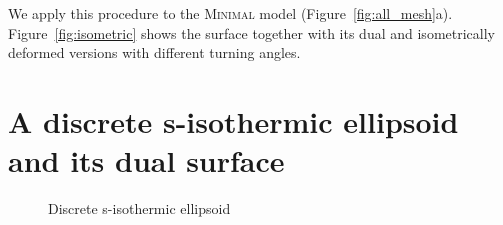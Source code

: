 \documentclass[Thesis.tex]{subfiles}
\begin{document}
We apply this procedure to the \textsc{Minimal} model
\mbox{(Figure~\ref{fig:all_mesh}a)}. Figure~\ref{fig:isometric} shows the
surface together
with its dual and isometrically deformed versions with different turning angles.

\section{A discrete s-isothermic ellipsoid and its dual surface}
\label{sec:discrete_ellipsoid}

\begin{figure}
\centering
{}
\caption{Discrete s-isothermic ellipsoid}
\label{fig:ellipsoid} 
\end{figure}
\end{document}
